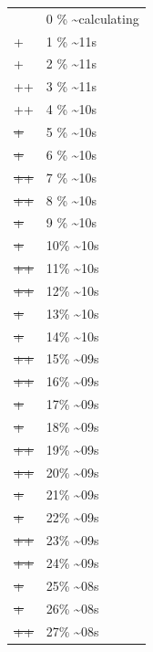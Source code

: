 \documentclass[12pt]{article}
\begin{document}
\begin{center}
\begin{tabular}{ll}
 & 0 \% \textasciitilde{}calculating\\
+ & 1 \% \textasciitilde{}11s\\
+ & 2 \% \textasciitilde{}11s\\
++ & 3 \% \textasciitilde{}11s\\
++ & 4 \% \textasciitilde{}10s\\
\sout{+} & 5 \% \textasciitilde{}10s\\
\sout{+} & 6 \% \textasciitilde{}10s\\
\sout{++} & 7 \% \textasciitilde{}10s\\
\sout{++} & 8 \% \textasciitilde{}10s\\
\sout{\sout{+}} & 9 \% \textasciitilde{}10s\\
\sout{\sout{+}} & 10\% \textasciitilde{}10s\\
\sout{\sout{++}} & 11\% \textasciitilde{}10s\\
\sout{\sout{++}} & 12\% \textasciitilde{}10s\\
\sout{\sout{\sout{+}}} & 13\% \textasciitilde{}10s\\
\sout{\sout{\sout{+}}} & 14\% \textasciitilde{}10s\\
\sout{\sout{\sout{++}}} & 15\% \textasciitilde{}09s\\
\sout{\sout{\sout{++}}} & 16\% \textasciitilde{}09s\\
\sout{\sout{\sout{\sout{+}}}} & 17\% \textasciitilde{}09s\\
\sout{\sout{\sout{\sout{+}}}} & 18\% \textasciitilde{}09s\\
\sout{\sout{\sout{\sout{++}}}} & 19\% \textasciitilde{}09s\\
\sout{\sout{\sout{\sout{++}}}} & 20\% \textasciitilde{}09s\\
\sout{\sout{\sout{\sout{\sout{+}}}}} & 21\% \textasciitilde{}09s\\
\sout{\sout{\sout{\sout{\sout{+}}}}} & 22\% \textasciitilde{}09s\\
\sout{\sout{\sout{\sout{\sout{++}}}}} & 23\% \textasciitilde{}09s\\
\sout{\sout{\sout{\sout{\sout{++}}}}} & 24\% \textasciitilde{}09s\\
\sout{\sout{\sout{\sout{\sout{\sout{+}}}}}} & 25\% \textasciitilde{}08s\\
\sout{\sout{\sout{\sout{\sout{\sout{+}}}}}} & 26\% \textasciitilde{}08s\\
\sout{\sout{\sout{\sout{\sout{\sout{++}}}}}} & 27\% \textasciitilde{}08s\\

\end{tabular}
\end{center}
\end{document}
